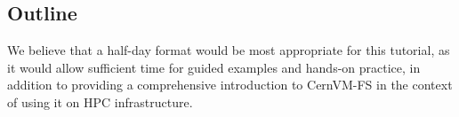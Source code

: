 \subsection*{Outline}

We believe that a half-day format would be most appropriate for this tutorial, as it would allow sufficient
time for guided examples and hands-on practice, in addition to providing a comprehensive introduction to CernVM-FS
in the context of using it on HPC infrastructure.

% 

